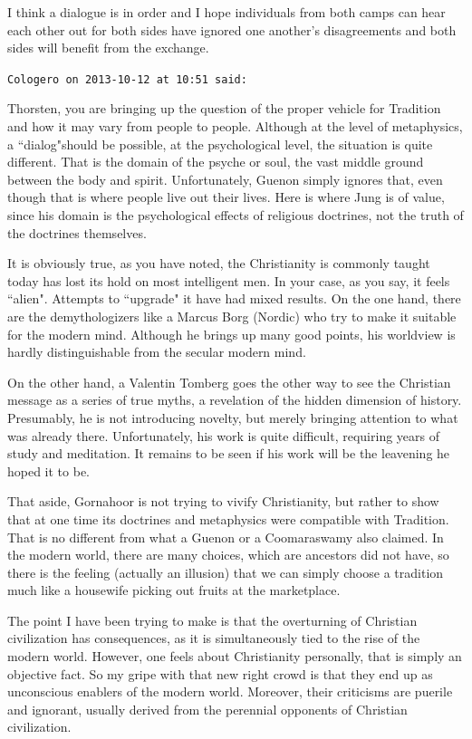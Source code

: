 \begin{footnotesize}
\begin{sffamily}
I think a dialogue is in order and I hope individuals from both camps can hear each other out for both sides have
ignored one another's disagreements and both sides will benefit from the exchange.


\hfill

\texttt{Cologero on 2013-10-12 at 10:51 said: }

Thorsten, you are bringing up the question of the proper vehicle for Tradition and how it may vary from people to
people. Although at the level of metaphysics, a ``dialog"should be possible, at the psychological level, the situation
is quite different. That is the domain of the psyche or soul, the vast middle ground between the body and spirit.
Unfortunately, Guenon simply ignores that, even though that is where people live out their lives. Here is where Jung is
of value, since his domain is the psychological effects of religious doctrines, not the truth of the doctrines
themselves.

It is obviously true, as you have noted, the Christianity is commonly taught today has lost its hold on most intelligent
men. In your case, as you say, it feels ``alien". Attempts to ``upgrade" it have had mixed results. On the one hand,
there are the demythologizers like a Marcus Borg (Nordic) who try to make it suitable for the modern mind. Although he
brings up many good points, his worldview is hardly distinguishable from the secular modern mind.

On the other hand, a Valentin Tomberg goes the other way to see the Christian message as a series of true myths, a
revelation of the hidden dimension of history. Presumably, he is not introducing novelty, but merely bringing attention
to what was already there. Unfortunately, his work is quite difficult, requiring years of study and meditation. It
remains to be seen if his work will be the leavening he hoped it to be.

That aside, Gornahoor is not trying to vivify Christianity, but rather to show that at one time its doctrines and
metaphysics were compatible with Tradition. That is no different from what a Guenon or a Coomaraswamy also claimed. In
the modern world, there are many choices, which are ancestors did not have, so there is the feeling (actually an
illusion) that we can simply choose a tradition much like a housewife picking out fruits at the marketplace.

The point I have been trying to make is that the overturning of Christian civilization has consequences, as it is
simultaneously tied to the rise of the modern world. However, one feels about Christianity personally, that is simply
an objective fact. So my gripe with that new right crowd is that they end up as unconscious enablers of the modern
world. Moreover, their criticisms are puerile and ignorant, usually derived from the perennial opponents of Christian
civilization.


\end{sffamily}
\end{footnotesize}
